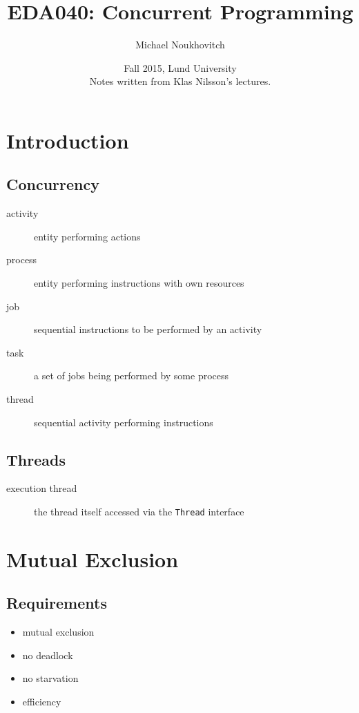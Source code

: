 \documentclass[]{article}
\theoremstyle{definition}
\begin{document}
	\let\ref\Cref

	\title{\bf{EDA040: Concurrent Programming}}
	\date{Fall 2015, Lund University\\ \center Notes written from Klas Nilsson's lectures.}
	\author{Michael Noukhovitch}

	\maketitle
	\newpage
	\tableofcontents
	\newpage

	\section{Introduction}
	\subsection{Concurrency}
	\begin{description}
		\item[activity] entity performing actions
		\item[process] entity performing instructions with own resources
		\item[job] sequential instructions to be performed by an activity
		\item[task] a set of jobs being performed by some process
		\item[thread] sequential activity performing instructions
	\end{description}

	\subsection{Threads}
	\begin{description}
		\item[execution thread] the thread itself accessed via the \lstinline|Thread| interface
	\end{description}

	\section{Mutual Exclusion}
	\subsection{Requirements}
	\begin{itemize}
		\item mutual exclusion
		\item no deadlock
		\item no starvation
		\item efficiency
	\end{itemize}
\end{document}
